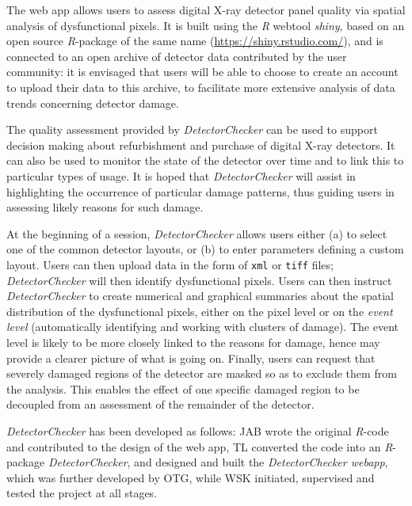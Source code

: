 \documentclass[11pt,a4paper]{article}
\newcommand{\DetectorChecker}{\emph{DetectorChecker}\xspace}
\newcommand{\DetectorCheckerWebApp}{\emph{DetectorChecker webapp}\xspace}
\newcommand{\Rsoftware}{\emph{R}\xspace}
\begin{document}
The web app allows users to assess digital X-ray detector panel quality via spatial analysis of dysfunctional pixels.
It is built using the \Rsoftware webtool \emph{shiny}, based on an open source \Rsoftware-package of the same name (\url{https://shiny.rstudio.com/}),
and is connected to an open archive of detector data contributed by the user community:
it is envisaged that users will be able to choose to create an account to upload their data to this archive,
to facilitate more extensive analysis of data trends concerning detector damage.

The quality assessment provided by \DetectorChecker can be used to support decision making 
about refurbishment and purchase of digital X-ray detectors. 
It can also be used to monitor the state of the detector over time and to link this to particular types of usage.
It is hoped that \DetectorChecker will assist in highlighting the occurrence of particular damage patterns, thus guiding
users in assessing likely reasons for such damage.

At the beginning of a session, 
\DetectorChecker allows users either (a) to select one of the common detector layouts,
or (b) to enter parameters defining a custom layout. 
Users can then upload data in the form of \texttt{xml} or \texttt{tiff} files;
\DetectorChecker will then identify dysfunctional pixels.
Users can then instruct
\DetectorChecker to create numerical and graphical summaries 
about the spatial distribution of the dysfunctional pixels,
either on the pixel level or on the \emph{event level}
(automatically identifying and working with clusters of damage). The event level is likely to be more
closely linked to the reasons for damage, hence may provide a clearer picture 
of what is going on.
Finally, users can request that severely damaged regions of the detector are masked so as 
to exclude them from the analysis. This enables the effect of one specific damaged region 
to be decoupled from an assessment of the remainder of the detector.

\DetectorChecker has been developed as follows:
JAB wrote the original \Rsoftware-code and contributed to the design of the web app, 
TL converted the code into an \Rsoftware-package
\DetectorChecker,
and designed and built the 
\DetectorCheckerWebApp, 
which was further developed by OTG, while WSK initiated, supervised and tested the project at all stages. 
 
\end{document}
